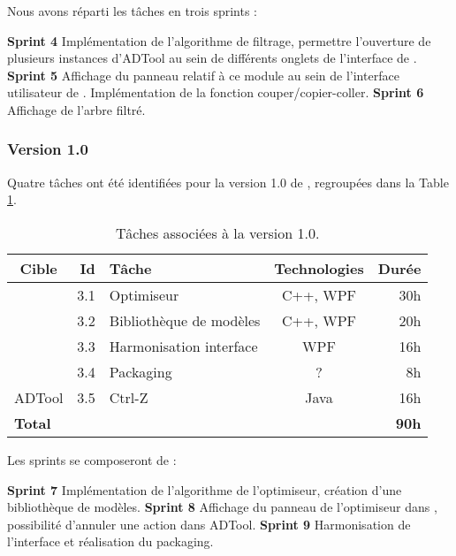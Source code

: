 			Nous avons réparti les tâches en trois sprints :

			\noindent\textbf{Sprint 4} Implémentation de l'algorithme de filtrage, permettre l'ouverture de plusieurs instances d'ADTool au sein de différents onglets de l'interface de \glasir{}.\newline 
			\textbf{Sprint 5} Affichage du panneau relatif à ce module au sein de l'interface utilisateur de \glasir{}. Implémentation de la fonction couper/copier-coller.\newline %
			\textbf{Sprint 6} Affichage de l'arbre filtré.

		\subsubsection{Version 1.0}
			Quatre tâches ont été identifiées pour la version 1.0 de \glasir{}, regroupées dans la {\sc Table} \ref{tab:taches_units_3}.
			\begin{table}[h]
				\centering
				\begin{tabular}{|c|r|l|c|r|}
					\hline
					\textbf{Cible} & \textbf{Id} & \textbf{Tâche} & \textbf{Technologies} & \textbf{Durée}\\
					\hline

					\multirow{4}{*}{\glasir{}} & 3.1 & Optimiseur & C++, WPF & 30h\\
					\cline{2-5}
					 & 3.2 & Bibliothèque de modèles & C++, WPF & 20h\\
					\cline{2-5}
					 & 3.3 & Harmonisation interface & WPF & 16h\\
					\cline{2-5}
					 & 3.4 & Packaging & ? & 8h\\
					\hline

					\multirow{1}{*}{ADTool} & 3.5 & Ctrl-Z & \multirow{1}{*}{Java} & 16h\\
					\hline

					\multicolumn{4}{|l|}{\bf Total} & {\bf 90h}\\
					\hline
				\end{tabular}
				\caption{Tâches associées à la version 1.0.}
				\label{tab:taches_units_3}
			\end{table}
			
			Les sprints se composeront de :

			\noindent\textbf{Sprint 7} Implémentation de l'algorithme de l'optimiseur, création d'une bibliothèque de modèles.\newline
			\textbf{Sprint 8} Affichage du panneau de l'optimiseur dans \glasir{}, possibilité d'annuler une action dans ADTool.\newline
			\textbf{Sprint 9} Harmonisation de l'interface et réalisation du packaging. \newline

